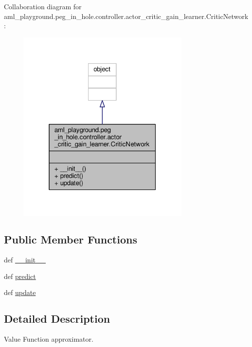 Collaboration diagram for aml\-\_\-playground.\-peg\-\_\-in\-\_\-hole.\-controller.\-actor\-\_\-critic\-\_\-gain\-\_\-learner.\-Critic\-Network\-:
\nopagebreak
\begin{figure}[H]
\begin{center}
\leavevmode
\includegraphics[width=244pt]{classaml__playground_1_1peg__in__hole_1_1controller_1_1actor__critic__gain__learner_1_1_critic_network__coll__graph}
\end{center}
\end{figure}
\subsection*{Public Member Functions}
\begin{DoxyCompactItemize}
\item 
def \hyperlink{classaml__playground_1_1peg__in__hole_1_1controller_1_1actor__critic__gain__learner_1_1_critic_network_a76303cb55e9b1f8136a03defd6d8fcec}{\-\_\-\-\_\-init\-\_\-\-\_\-}
\item 
def \hyperlink{classaml__playground_1_1peg__in__hole_1_1controller_1_1actor__critic__gain__learner_1_1_critic_network_a852ab237e2862271ef02f20afe3ffe9b}{predict}
\item 
def \hyperlink{classaml__playground_1_1peg__in__hole_1_1controller_1_1actor__critic__gain__learner_1_1_critic_network_a1e3f14374d6e308b33c01e75c2c4f38d}{update}
\end{DoxyCompactItemize}


\subsection{Detailed Description}
\begin{DoxyVerb}Value Function approximator. 
\end{DoxyVerb}
 

